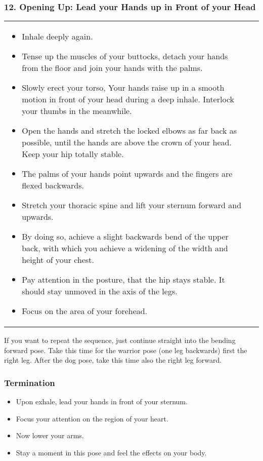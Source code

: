 \documentclass[../Book.Stress_regulation.tex]{subfiles}
\begin{document}
\subsubsection{12. Opening Up: Lead your Hands up in Front of your Head}

\begin{tabular}{p{9.7cm} p{1.8cm}}
  
\begin{itemize}
\item Inhale deeply again.
\item Tense up the muscles of your buttocks, detach your hands from the floor and join your hands with the palms.
\item Slowly erect your torso, Your hands raise up in a smooth motion in front of your head during a deep inhale.
  Interlock your thumbs in the meanwhile.
\item Open the hands and stretch the locked elbows as far back as possible, until the hands are above the crown of your head. Keep your hip totally stable.
\item The palms of your hands point upwards and the fingers are flexed backwards.
\item Stretch your thoracic spine and lift your sternum forward and upwards.
\item By doing so, achieve a slight backwards bend of the upper back, with which you achieve a widening of the width and height of your chest.
\item Pay attention in the posture, that the hip stays stable. It should stay unmoved in the axis of the legs.
\item Focus on the area of your forehead.
\end{itemize}
  &
    \raisebox{-1.2\totalheight}{\texttt{[image: SS\_Opening]}}
  
\end{tabular}

If you want to repeat the sequence, just continue straight into the bending forward pose.
Take this time for the warrior pose (one leg backwards) first the right leg.
After the dog pose, take this time also the right leg forward.

\subsubsection{Termination}

\begin{itemize}
\item Upon exhale, lead your hands in front of your sternum.
\item Focus your attention on the region of your heart.
\item Now lower your arms.
\item Stay a moment in this pose and feel the effects on your body.
\end{itemize}
\end{document}
